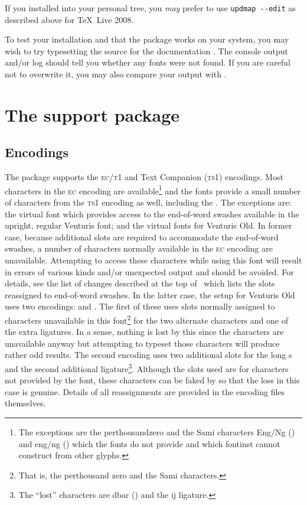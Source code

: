 \documentclass[11pt,british]{article}
\begin{document}
If you installed into your personal tree, you \emph{may} prefer to use \verb|updmap --edit| as described above for \TeX~Live 2008.

To test your installation and that the package works on your system, you may wish to try typesetting the source for the documentation . The console output and/or log should tell you whether any fonts were not found. If you are careful not to overwrite it, you may also compare your output with .

\section{The support package}\label{sec:support}

\subsection{Encodings}

The package supports the \textsc{ec}/\textsc{t1} and Text Companion (\textsc{ts1}) encodings. Most characters in the \textsc{ec} encoding are available\footnote{The exceptions are the perthousandzero and the Sami characters Eng/Ng (\lmrm{\NG}) and eng/ng (\lmrm{\ng}) which the fonts do not provide and which fontinst cannot construct from other glyphs.} and the fonts provide a small number of characters from the \textsc{ts1} encoding as well, including the \texteuro. The exceptions are: the virtual font which provides access to the end-of-word swashes available in the upright, regular Venturis font; and the virtual fonts for Venturis Old. In former case, because additional slots are required to accommodate the end-of-word swashes, a number of characters normally available in the \textsc{ec} encoding are unavailable. Attempting to access these characters while using this font will result in errors of various kinds and/or unexpected output and should be avoided. For details, see the list of changes described at the top of \ which lists the slots reassigned to end-of-word swashes. In the latter case, the setup for Venturis Old uses two encodings:  and . The first of these uses slots normally assigned to characters unavailable in this font\footnote{That is, the perthousand zero and the Sami characters.} for the two alternate characters and one of the extra ligatures. In a sense, nothing is lost by this since the characters are unavailable anyway but attempting to typeset those characters will produce rather odd results. The second encoding uses two additional slots for the long s and the second additional ligature\footnote{The ``lost'' characters are dbar (\dj) and the ij ligature.}. Although the slots used are for characters not provided by the font, these characters can be faked by  so that the loss in this case is genuine. Details of all reassignments are provided in the encoding files themselves.
\end{document}
